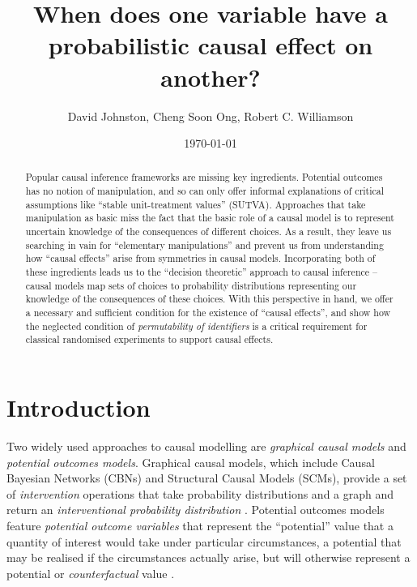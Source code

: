 \documentclass{article}
\title{When does one variable have a probabilistic causal effect on another?}
\date{\today}
\author{ David Johnston, Cheng Soon Ong, Robert C. Williamson }
\theoremstyle{plain}
\theoremstyle{definition}
\begin{document}
\maketitle


\tableofcontents

\begin{abstract}
Popular causal inference frameworks are missing key ingredients. Potential outcomes has no notion of manipulation, and so can only offer informal explanations of critical assumptions like ``stable unit-treatment values'' (SUTVA). Approaches that take manipulation as basic miss the fact that the basic role of a causal model is to represent uncertain knowledge of the consequences of different choices. As a result, they leave us searching in vain for ``elementary manipulations'' and prevent us from understanding how ``causal effects'' arise from symmetries in causal models. Incorporating both of these ingredients leads us to the ``decision theoretic'' approach to causal inference -- causal models map sets of choices to probability distributions representing our knowledge of the consequences of these choices. With this perspective in hand, we offer a necessary and sufficient condition for the existence of ``causal effects'', and show how the neglected condition of \emph{permutability of identifiers} is a critical requirement for classical randomised experiments to support causal effects. 
\end{abstract}

\section{Introduction}

Two widely used approaches to causal modelling are \emph{graphical causal models} and \emph{potential outcomes models}. Graphical causal models, which include Causal Bayesian Networks (CBNs) and Structural Causal Models (SCMs), provide a set of \emph{intervention} operations that take probability distributions and a graph and return an \emph{interventional  probability distribution} \citep{pearl_causality:_2009}. Potential outcomes models feature \emph{potential outcome variables} that represent the ``potential'' value that a quantity of interest would take under particular circumstances, a potential that may be realised if the circumstances actually arise, but will otherwise represent a potential or \emph{counterfactual} value \citep{rubin_causal_2005}.
\end{document}
